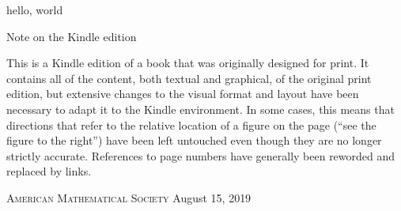 \documentclass{amsart}
\begin{document}
hello, world

\begin{NLMnote}{Note on the Kindle edition}

This is a Kindle edition of a book that was originally designed for
print.  It contains all of the content, both textual and graphical, of
the original print edition, but extensive changes to the visual format
and layout have been necessary to adapt it to the Kindle environment.
In some cases, this means that directions that refer to the relative
location of a figure on the page (“see the figure to the right”) have
been left untouched even though they are no longer strictly accurate.
References to page numbers have generally been reworded and replaced
by links.

\begin{flushleft}
\textsc{American Mathematical Society}
August 15, 2019
\end{flushleft}

\end{NLMnote}
\end{document}
